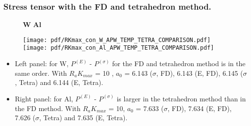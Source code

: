 \documentclass[10pt, handout]{beamer}
\newcommand{\sig}{\sigma}
\newcommand{\blue}[1]{{\color{blue} #1}}
\newcommand{\red}[1]{{\color{red} #1}}
\newcommand{\nologo}{\setbeamertemplate{logo}{}}  %
\begin{document}
{\nologo	
	    \begin{frame}
	    	\frametitle{Stress tensor with the FD and tetrahedron method.}
	    	\begin{small}
	    	\begin{figure}
	    		\textbf{W} \hspace{5cm}	\textbf{Al}  \par \medskip
	    		\texttt{[image: pdf/RKmax\_con\_W\_APW\_TEMP\_TETRA\_COMPARISON.pdf]} \hfil
	    		\texttt{[image: pdf/RKmax\_con\_Al\_APW\_TEMP\_TETRA\_COMPARISON.pdf]} 
	    	\end{figure}
	    	
	    	\begin{itemize}
	    		\item Left panel: for W, $P^{(E)}$ - $P^{(\sig)}$ for the FD and tetrahedron method is in the same order. With $R_{a}K_{max}$ = \red{10} , $a_0$ = \red{6.143} ($\sig$, FD), \red{6.143} (E, FD), \red{6.145} ($\sig$, Tetra) and \red{6.144} (E, Tetra).
	    		
	    		
	    		\item Right panel: for Al, $P^{(E)}$ - $P^{(\sig)}$ is larger in the tetrahedron method than in the FD method. With $R_{a}K_{max}$ = \red{10}, $a_0$ = \red{7.633} ($\sig$, FD), \red{7.634} (E, FD), \red{7.626} ($\sig$, Tetra) and \red{7.635} (E, Tetra).
	    		
	    	\end{itemize}
    		    	
    	
    	
	    	\end{small}	     	   	
	    \end{frame}
}	    
\end{document}
